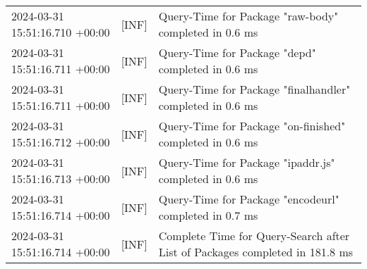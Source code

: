 {{\begin{tabularx}{\textwidth}{|l|l|X|}
                    2024-03-31 15:51:16.710 +00:00 & [INF] & Query-Time for Package "raw-body" completed in 0.6 ms \\
                    2024-03-31 15:51:16.711 +00:00 & [INF] & Query-Time for Package "depd" completed in 0.6 ms \\
                    2024-03-31 15:51:16.711 +00:00 & [INF] & Query-Time for Package "finalhandler" completed in 0.6 ms \\
                    2024-03-31 15:51:16.712 +00:00 & [INF] & Query-Time for Package "on-finished" completed in 0.6 ms \\
                    2024-03-31 15:51:16.713 +00:00 & [INF] & Query-Time for Package "ipaddr.js" completed in 0.6 ms \\
                    2024-03-31 15:51:16.714 +00:00 & [INF] & Query-Time for Package "encodeurl" completed in 0.7 ms \\
                    2024-03-31 15:51:16.714 +00:00 & [INF] & Complete Time for Query-Search after List of Packages completed in 181.8 ms \\
                    \hline
                \end{tabularx}
            }
        }

